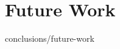 \documentclass[epsbased,copyright,final,covers,extendedindex,firstnumbered,tfm,gnuplot,english]{tfgtfmthesisuam}
\begin{document}
  \section{Future Work\label{SEC:FUTUREWORK}}{conclusions/future-work}


\end{document}
